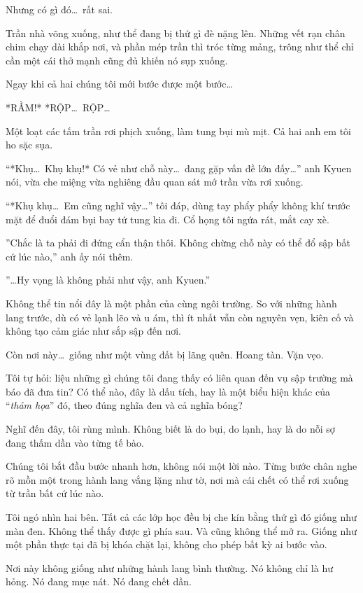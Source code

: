 \documentclass[../main.tex]{subfiles}
\begin{document}
Nhưng có gì đó\dots\ rất sai.

Trần nhà võng xuống, như thể đang bị thứ gì đè nặng lên. Những vết rạn chân chim chạy dài khắp nơi, và phần mép trần thì tróc từng mảng, trông như thể chỉ cần một cái thở mạnh cũng đủ khiến nó sụp xuống.

Ngay khi cả hai chúng tôi mới bước được một bước\dots

*RẦM!* *RỘP\dots\ RỘP\dots*

Một loạt các tấm trần rơi phịch xuống, làm tung bụi mù mịt. Cả hai anh em tôi ho sặc sụa.

``*Khụ\dots\ Khụ khụ!* Có vẻ như chỗ này\dots\ đang gặp vấn đề lớn đấy\dots'' anh Kyuen nói, vừa che miệng vừa nghiêng đầu quan sát mớ trần vừa rơi xuống.

``*Khụ khụ\dots\ Em cũng nghĩ vậy\dots'' tôi đáp, dùng tay phẩy phẩy không khí trước mặt để đuổi đám bụi bay tứ tung kia đi. Cổ họng tôi ngứa rát, mắt cay xè.

''Chắc là ta phải đi đứng cẩn thận thôi. Không chừng chỗ này có thể đổ sập bất cứ lúc nào,'' anh ấy nói thêm.

''\dots Hy vọng là không phải như vậy, anh Kyuen.''

Không thể tin nổi đây là một phần của cùng ngôi trường. So với những hành lang trước, dù có vẻ lạnh lẽo và u ám, thì ít nhất vẫn còn nguyên vẹn, kiên cố và không tạo cảm giác như sắp sập đến nơi.

Còn nơi này\dots\ giống như một vùng đất bị lãng quên. Hoang tàn. Vặn vẹo.

Tôi tự hỏi: liệu những gì chúng tôi đang thấy có liên quan đến vụ sập trường mà báo đã đưa tin? Có thể nào, đây là dấu tích, hay là một biểu hiện khác của ``\emph{thảm họa}'' đó, theo đúng nghĩa đen và cả nghĩa bóng?

Nghĩ đến đây, tôi rùng mình. Không biết là do bụi, do lạnh, hay là do nỗi sợ đang thấm dần vào từng tế bào.

Chúng tôi bắt đầu bước nhanh hơn, không nói một lời nào. Từng bước chân nghe rõ mồn một trong hành lang vắng lặng như tờ, nơi mà cái chết có thể rơi xuống từ trần bất cứ lúc nào.

Tôi ngó nhìn hai bên. Tất cả các lớp học đều bị che kín bằng thứ gì đó giống như màn đen. Không thể thấy được gì phía sau. Và cũng không thể mở ra. Giống như một phần thực tại đã bị khóa chặt lại, không cho phép bất kỳ ai bước vào.

Nơi này không giống như những hành lang bình thường. Nó không chỉ là hư hỏng. Nó đang mục nát. Nó đang chết dần.
\end{document}
